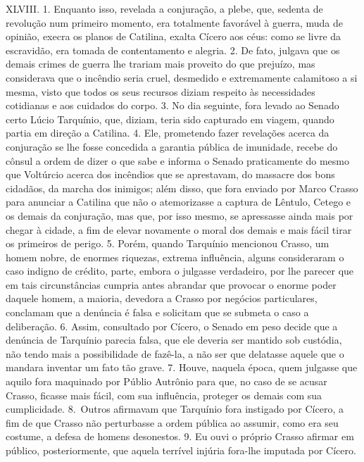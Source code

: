 XLVIII. 1. Enquanto isso, revelada a conjuração, a plebe, que, sedenta de
revolução num primeiro momento, era totalmente favorável à guerra, muda de
opinião, execra os planos de Catilina, exalta Cícero aos céus: como se livre da
escravidão, era tomada de contentamento e alegria. 2. De fato, julgava que os
demais crimes de guerra lhe trariam mais proveito do que prejuízo, mas
considerava que o incêndio seria cruel, desmedido e extremamente calamitoso a
si mesma, visto que todos os seus recursos diziam respeito às necessidades
cotidianas e aos cuidados do corpo. 3. No dia seguinte, fora levado ao Senado
certo Lúcio Tarquínio, que, diziam, teria sido capturado em viagem, quando
partia em direção a Catilina. 4. Ele, prometendo fazer revelações acerca da
conjuração se lhe fosse concedida a garantia pública de imunidade, recebe do
cônsul a ordem de dizer o que sabe e informa o Senado praticamente do mesmo que
Voltúrcio acerca dos incêndios que se aprestavam, do massacre dos bons
cidadãos, da marcha dos inimigos; além disso, que fora enviado por Marco Crasso
para anunciar a Catilina que não o atemorizasse a captura de Lêntulo, Cetego e
os demais da conjuração, mas que, por isso mesmo, se apressasse ainda mais por
chegar à cidade, a fim de elevar novamente o moral dos demais e mais fácil
tirar os primeiros de perigo. 5. Porém, quando Tarquínio mencionou Crasso, um
homem nobre, de enormes riquezas, extrema influência, alguns consideraram o
caso indigno de crédito, parte, embora o julgasse verdadeiro, por lhe parecer
que em tais circunstâncias cumpria antes abrandar que provocar o enorme poder
daquele homem, a maioria, devedora a Crasso por negócios particulares,
conclamam que a denúncia é falsa e solicitam que se submeta o caso a
deliberação. 6. Assim, consultado por Cícero, o Senado em peso decide que a
denúncia de Tarquínio parecia falsa, que ele deveria ser mantido sob
custódia, não tendo mais a possibilidade de fazê-la, a não ser que delatasse aquele que
o mandara inventar um fato tão grave. 7. Houve, naquela época, quem julgasse
que aquilo fora maquinado por Públio Autrônio para que, no caso de se acusar
Crasso, ficasse mais fácil, com sua influência, proteger os demais com sua
cumplicidade. 8.~Outros afirmavam que Tarquínio fora instigado por Cícero, a
fim de que Crasso não perturbasse a ordem pública ao assumir, como era seu
costume, a defesa de homens desonestos. 9. Eu ouvi o próprio Crasso afirmar em
público, posteriormente, que aquela terrível injúria fora-lhe imputada por
Cícero.

